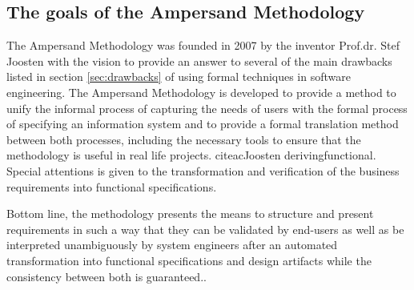 \begin{description}
\end{description}


\subsection{The goals of the Ampersand Methodology}
   
The Ampersand Methodology was founded in 2007 by the inventor Prof.dr. Stef Joosten with the vision to provide an answer to several of the main drawbacks listed in section \autoref{sec:drawbacks} of using formal techniques  in software engineering. 
The Ampersand Methodology is  developed to provide a method to unify the informal process of capturing the needs of users with the formal process of specifying an information system and to provide a formal translation method between both processes, including the necessary tools to ensure that the methodology is useful in real life projects.
citeac{Joosten derivingfunctional}. Special attentions is given to the transformation and verification of the business requirements into functional specifications.

Bottom line, the methodology presents the means to structure and present requirements in such a way that they can be validated by end-users as well as be interpreted unambiguously by system engineers after an automated transformation into functional specifications and design artifacts while the consistency between both is guaranteed..

